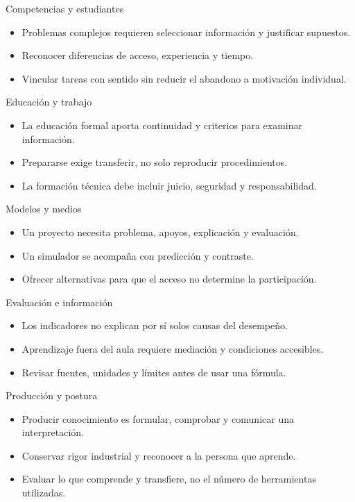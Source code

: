 \documentclass[
	spanish,
	aspectratio=1610,
	xcolor={dvipsnames,table}
]{beamer}
\begin{document}
\begin{frame}{Competencias y estudiantes}
\fontsize{14}{18}\selectfont\begin{itemize}\setlength{\itemsep}{.45cm}
\item Problemas complejos requieren seleccionar información y justificar supuestos.
\item Reconocer diferencias de acceso, experiencia y tiempo.
\item Vincular tareas con sentido sin reducir el abandono a motivación individual.
\end{itemize}
\end{frame}
\begin{frame}{Educación y trabajo}
\fontsize{14}{18}\selectfont\begin{itemize}\setlength{\itemsep}{.45cm}
\item La educación formal aporta continuidad y criterios para examinar información.
\item Prepararse exige transferir, no solo reproducir procedimientos.
\item La formación técnica debe incluir juicio, seguridad y responsabilidad.
\end{itemize}
\end{frame}
\begin{frame}{Modelos y medios}
\fontsize{14}{18}\selectfont\begin{itemize}\setlength{\itemsep}{.45cm}
\item Un proyecto necesita problema, apoyos, explicación y evaluación.
\item Un simulador se acompaña con predicción y contraste.
\item Ofrecer alternativas para que el acceso no determine la participación.
\end{itemize}
\end{frame}
\begin{frame}{Evaluación e información}
\fontsize{14}{18}\selectfont\begin{itemize}\setlength{\itemsep}{.45cm}
\item Los indicadores no explican por sí solos causas del desempeño.
\item Aprendizaje fuera del aula requiere mediación y condiciones accesibles.
\item Revisar fuentes, unidades y límites antes de usar una fórmula.
\end{itemize}
\end{frame}
\begin{frame}{Producción y postura}
\fontsize{14}{18}\selectfont\begin{itemize}\setlength{\itemsep}{.45cm}
\item Producir conocimiento es formular, comprobar y comunicar una interpretación.
\item Conservar rigor industrial y reconocer a la persona que aprende.
\item Evaluar lo que comprende y transfiere, no el número de herramientas utilizadas.
\end{itemize}
\end{frame}
\end{document}
